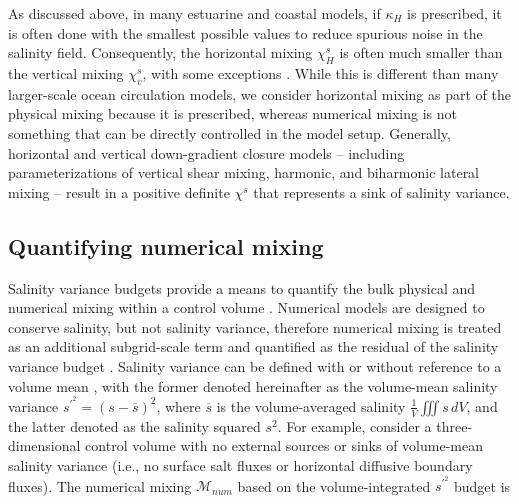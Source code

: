 As discussed above, in many estuarine and coastal models, if $\kappa_H$ is prescribed, it is often done with the smallest possible values to reduce spurious noise in the salinity field. Consequently, the horizontal mixing $\chi_H^s$ is often much smaller \citep{geyer2014estuarine} than the vertical mixing $\chi_v^s$, with some exceptions \citep{Broatch_2022}. While this is different than many larger-scale ocean circulation models, we consider horizontal mixing as part of the physical mixing because it is prescribed, whereas numerical mixing is not something that can be directly controlled in the model setup. Generally, horizontal and vertical down-gradient closure models -- including parameterizations of vertical shear mixing, harmonic, and biharmonic lateral mixing -- result in a positive definite $\chi^s$ that represents a sink of salinity variance.

\subsection{Quantifying numerical mixing}

Salinity variance budgets provide a means to quantify the bulk physical and numerical mixing within a control volume \citep{Li_2018, Lorenz_2021, Qu_2022_box}. Numerical models are designed to conserve salinity, but not salinity variance, therefore numerical mixing is treated as an additional subgrid-scale term and quantified as the residual of the salinity variance budget \citep{MacCready_2018}. Salinity variance can be defined with or without reference to a volume mean \citep{Burchard_2008, Qu_2022_box}, with the former denoted hereinafter as the volume-mean salinity variance $s^{\prime^2} = (s-\overline{s})^2$, where $\overline{s}$ is the volume-averaged salinity $\frac{1}{V} \iiint s \, dV$, and the latter denoted as the salinity squared $s^2$. For example, consider a three-dimensional control volume with no external sources or sinks of volume-mean salinity variance (i.e., no surface salt fluxes or horizontal diffusive boundary fluxes). The numerical mixing $\mathcal{M}_{num}$ based on the volume-integrated $s^{\prime^2}$ budget is

